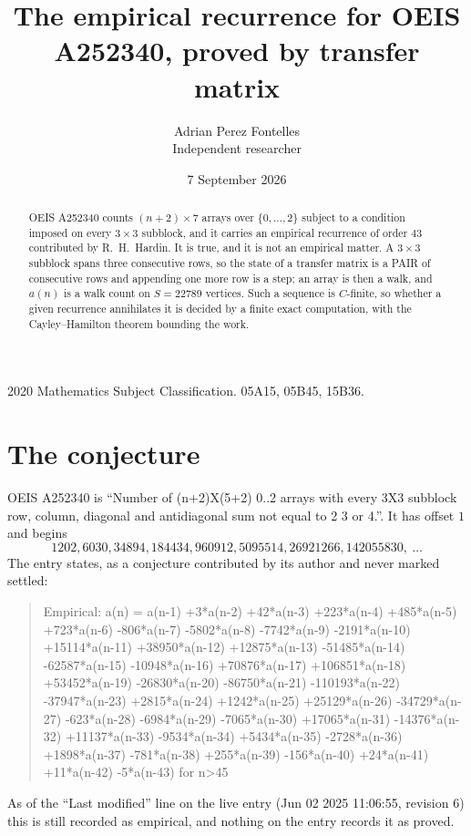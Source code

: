 \documentclass[11pt,a4paper]{article}
\title{The empirical recurrence for OEIS A252340, proved by transfer matrix}
\author{Adrian Perez Fontelles\\ \small Independent researcher}
\date{7 September 2026}
\theoremstyle{plain}
\theoremstyle{definition}
\begin{document}
\maketitle

\begin{abstract}
OEIS A252340 counts $(n+2)\times7$ arrays over $\{0,\dots,2\}$ subject to a condition imposed on
every $3\times3$ subblock, and it carries an empirical recurrence of order $43$
contributed by R.~H.~Hardin. It is true, and it is not an empirical matter. A $3\times3$
subblock spans three consecutive rows, so the state of a transfer matrix is a PAIR of
consecutive rows and appending one more row is a step; an array is then a walk, and
$a(n)$ is a walk count on $S=22789$ vertices. Such a sequence is $C$-finite, so whether a given
recurrence annihilates it is decided by a finite exact computation, with the Cayley--Hamilton
theorem bounding the work.
\end{abstract}

\noindent\small 2020 Mathematics Subject Classification. 05A15, 05B45, 15B36.\normalsize

\section{The conjecture}

OEIS A252340 is ``Number of (n+2)X(5+2) 0..2 arrays with every 3X3 subblock row, column, diagonal and antidiagonal sum not equal to 2 3 or 4.''. It has offset $1$ and begins
\[
1202, 6030, 34894, 184434, 960912, 5095514, 26921266, 142055830,\ \dots
\]
The entry states, as a conjecture contributed by its author and never marked settled:
\begin{quote}
Empirical: a(n) = a(n-1) +3*a(n-2) +42*a(n-3) +223*a(n-4) +485*a(n-5) +723*a(n-6) -806*a(n-7) -5802*a(n-8) -7742*a(n-9) -2191*a(n-10) +15114*a(n-11) +38950*a(n-12) +12875*a(n-13) -51485*a(n-14) -62587*a(n-15) -10948*a(n-16) +70876*a(n-17) +106851*a(n-18) +53452*a(n-19) -26830*a(n-20) -86750*a(n-21) -110193*a(n-22) -37947*a(n-23) +2815*a(n-24) +1242*a(n-25) +25129*a(n-26) -34729*a(n-27) -623*a(n-28) -6984*a(n-29) -7065*a(n-30) +17065*a(n-31) -14376*a(n-32) +11137*a(n-33) -9534*a(n-34) +5434*a(n-35) -2728*a(n-36) +1898*a(n-37) -781*a(n-38) +255*a(n-39) -156*a(n-40) +24*a(n-41) +11*a(n-42) -5*a(n-43) for n>45
\end{quote}
As of the ``Last modified'' line on the live entry (Jun 02 2025 11:06:55, revision 6) this is still
recorded as empirical, and nothing on the entry records it as proved.
\end{document}
